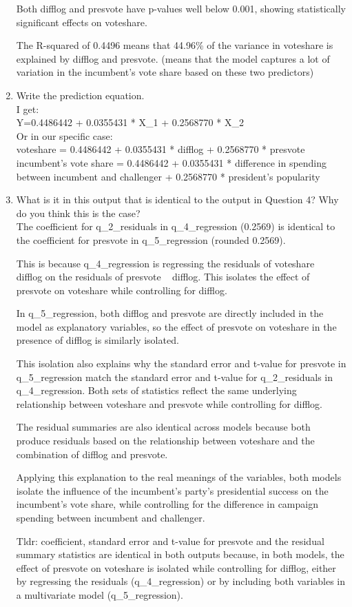 \documentclass[12pt,letterpaper]{article}
\begin{document}
\begin{enumerate}
	Both difflog and presvote have p-values well below 0.001, showing statistically significant effects on voteshare. 
	
	The R-squared of 0.4496 means that 44.96\% of the variance in voteshare is explained by difflog and presvote. (means that the model captures a lot of variation in the incumbent’s vote share based on these two predictors)
	
		\item Write the prediction equation.	\\
		
		I get: \\
		Y=0.4486442 + 0.0355431 * X\_1 + 0.2568770 * X\_2\\
		Or in our specific case: \\
		voteshare = 0.4486442 + 0.0355431 * difflog + 0.2568770 * presvote\\
		incumbent's vote share =  0.4486442 + 0.0355431 * difference in spending between incumbent and challenger + 0.2568770 * president's popularity \\
		\item What is it in this output that is identical to the output in Question 4? Why do you think this is the case? \\
		
		The coefficient for q\_2\_residuals in q\_4\_regression (0.2569) is identical to the coefficient for presvote in q\_5\_regression (rounded 0.2569).
		
		This is because q\_4\_regression is regressing the residuals of voteshare ~ difflog on the residuals of presvote ~ difflog. This isolates the effect of presvote on voteshare while controlling for difflog. 
		
		In q\_5\_regression, both difflog and presvote are directly included in the model as explanatory variables, so the effect of presvote on voteshare in the presence of difflog is similarly isolated.
		
		This isolation also explains why the standard error and t-value for presvote in q\_5\_regression match the standard error and t-value for q\_2\_residuals in q\_4\_regression. Both sets of statistics reflect the same underlying relationship between voteshare and presvote while controlling for difflog.
		
		The residual summaries are also identical across models because both produce residuals based on the relationship between voteshare and the combination of difflog and presvote.
		
		Applying this explanation to the real meanings of the variables, both models isolate the influence of the incumbent’s party’s presidential success on the incumbent’s vote share, while controlling for the difference in campaign spending between incumbent and challenger.
		
		Tldr: coefficient, standard error and t-value for presvote and the residual summary statistics are identical in both outputs
		because, in both models, the effect of presvote on voteshare is isolated
		while controlling for difflog, either by regressing the residuals (q\_4\_regression) 
		or by including both variables in a multivariate model (q\_5\_regression).
	\end{enumerate}
\end{document}
